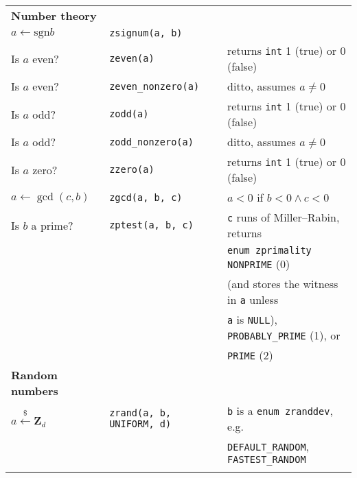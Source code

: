 \documentclass[10pt,draft]{article}
\newcommand{\entry}[3]{ #2 & {\tt #1} & #3 \\ }
\newcommand{\entrycont}[1]{ & & \hspace*{2ex} #1 \\ }
\newcommand{\entryTwo}[4]{\entry{#1}{#2}{#3}\entrycont{#4}}
\newcommand{\entryThree}[5]{\entryTwo{#1}{#2}{#3}{#4}\entrycont{#5}}
\newcommand{\entryFour}[6]{\entryThree{#1}{#2}{#3}{#4}{#5}\entrycont{#6}}
\newcommand{\entryFive}[7]{\entryFour{#1}{#2}{#3}{#4}{#5}{#6}\entrycont{#7}}
\begin{document}
\begin{tabular}{lll}
\textbf{Number theory} \\
\entry    {zsignum(a, b)}     {$a \gets \mbox{sgn} b$} {}
\entry    {zeven(a)}          {Is $a$ even?}           {returns {\tt int} 1 (true) or 0 (false)}
\entry    {zeven\_nonzero(a)} {Is $a$ even?}           {ditto, assumes $a \neq 0$}
\entry    {zodd(a)}           {Is $a$ odd?}            {returns {\tt int} 1 (true) or 0 (false)}
\entry    {zodd\_nonzero(a)}  {Is $a$ odd?}            {ditto, assumes $a \neq 0$}
\entry    {zzero(a)}          {Is $a$ zero?}           {returns {\tt int} 1 (true) or 0 (false)}
\entry    {zgcd(a, b, c)}     {$a \gets \gcd(c, b)$}   {$a < 0$ if $b < 0 \wedge c < 0$}
\entryFive{zptest(a, b, c)}   {Is $b$ a prime?}        {{\tt c} runs of Miller--Rabin, returns}
                                                       {{\tt enum zprimality} {\tt NONPRIME} (0)}
                                                       {(and stores the witness in {\tt a} unless}
                                                       {{\tt a} is {\tt NULL}), {\tt PROBABLY\_PRIME} (1), or}
                                                       {{\tt PRIME} (2)}

\textbf{Random numbers} \\
\entryTwo{zrand(a, b, UNIFORM, d)} {$a \xleftarrow{\$} \textbf{Z}_d$}
         {{\tt b} is a {\tt enum zranddev}, e.g.}
         {{\tt DEFAULT\_RANDOM}, {\tt FASTEST\_RANDOM}}
\\



\end{tabular}
\end{document}
